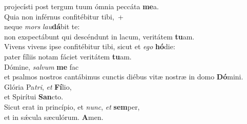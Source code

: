 \evenverse projecísti post tergum tuum ómnia peccáta \textbf{me}a.\\
\oddverse Quia non inférnus confitébitur tibi,~+\\
\oddverse  neque \textit{mors} \textit{lau}\textbf{dá}bit te:~\*\\
\oddverse non exspectábunt qui descéndunt in lacum, veritátem \textbf{tu}am.\\
\evenverse Vivens vivens ipse confitébitur tibi, sicut et \textit{e}\textit{go} \textbf{hó}die:~\*\\
\evenverse pater fíliis notam fáciet veritátem \textbf{tu}am.\\
\oddverse Dómine, \textit{sal}\textit{vum} \textbf{me} fac~\*\\
\oddverse et psalmos nostros cantábimus cunctis diébus vitæ nostræ in domo \textbf{Dó}mini.\\
\evenverse Glória Pa\textit{tri}, \textit{et} \textbf{Fí}lio,~\*\\
\evenverse et Spirítui \textbf{San}cto.\\
\oddverse Sicut erat in princípio, et \textit{nunc}, \textit{et} \textbf{sem}per,~\*\\
\oddverse et in sǽcula sæculórum. \textbf{A}men.\\
